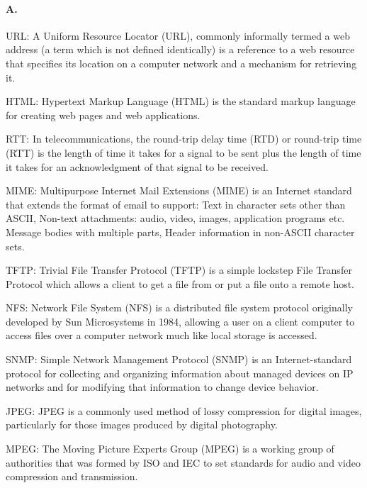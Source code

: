 \paragraph{A.}
URL: A Uniform Resource Locator (URL), commonly informally termed a web address (a term which is not defined identically) is a reference to a web resource that specifies its location on a computer network and a mechanism for retrieving it. 

\qquad HTML: Hypertext Markup Language (HTML) is the standard markup language for creating web pages and web applications.

\qquad RTT: In telecommunications, the round-trip delay time (RTD) or round-trip time (RTT) is the length of time it takes for a signal to be sent plus the length of time it takes for an acknowledgment of that signal to be received.

\qquad MIME: Multipurpose Internet Mail Extensions (MIME) is an Internet standard that extends the format of email to support: Text in character sets other than ASCII, Non-text attachments: audio, video, images, application programs etc. Message bodies with multiple parts, Header information in non-ASCII character sets.

\qquad TFTP: Trivial File Transfer Protocol (TFTP) is a simple lockstep File Transfer Protocol which allows a client to get a file from or put a file onto a remote host.

\qquad NFS: Network File System (NFS) is a distributed file system protocol originally developed by Sun Microsystems in 1984, allowing a user on a client computer to access files over a computer network much like local storage is accessed. 

\qquad SNMP: Simple Network Management Protocol (SNMP) is an Internet-standard protocol for collecting and organizing information about managed devices on IP networks and for modifying that information to change device behavior. 

\qquad JPEG: JPEG is a commonly used method of lossy compression for digital images, particularly for those images produced by digital photography. 

\qquad MPEG: The Moving Picture Experts Group (MPEG) is a working group of authorities that was formed by ISO and IEC to set standards for audio and video compression and transmission.